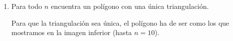 \begin{enumerate}
	
	\begin{figure}[H]
		\centering
	\end{figure}
	
	
	
	\item Para todo $n$ encuentra un polígono con una única triangulación.
	
	Para que la triangulación sea única, el polígono ha de ser como los que mostramos en la imagen inferior (hasta $n=10$).
	

\end{enumerate}

